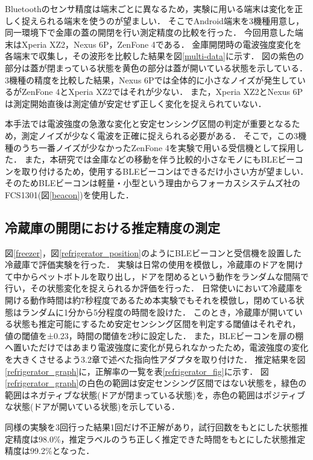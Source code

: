 Bluetoothのセンサ精度は端末ごとに異なるため，実験に用いる端末は変化を正しく捉えられる端末を使うのが望ましい．
そこでAndroid端末を3機種用意し，同一環境下で金庫の蓋の開閉を行い測定精度の比較を行った．
今回用意した端末はXperia XZ2，Nexus 6P，ZenFone 4である．
金庫開閉時の電波強度変化を各端末で収集し，その波形を比較した結果を図\ref{multi-data}に示す．
図の紫色の部分は蓋が閉まっている状態を黄色の部分は蓋が開いている状態を示している．
3機種の精度を比較した結果，Nexus 6Pでは全体的に小さなノイズが発生しているがZenFone 4とXperia XZ2ではそれが少ない．
また，Xperia XZ2とNexus 6Pは測定開始直後は測定値が安定せず正しく変化を捉えられていない．

本手法では電波強度の急激な変化と安定センシング区間の判定が重要となるため，測定ノイズが少なく電波を正確に捉えられる必要がある．
そこで，この3機種のうち一番ノイズが少なかったZenFone 4を実験で用いる受信機として採用した．
また，本研究では金庫などの移動を伴う比較的小さなモノにもBLEビーコンを取り付けるため，使用するBLEビーコンはできるだけ小さい方が望ましい．
そのためBLEビーコンは軽量・小型という理由からフォーカスシステムズ社のFCS1301(図\ref{beacon})を使用した．


\subsection{冷蔵庫の開閉における推定精度の測定}
図\ref{freezer}，図\ref{refrigerator_position}のようにBLEビーコンと受信機を設置した冷蔵庫で評価実験を行った．
実験は日常の使用を模倣し，冷蔵庫のドアを開けて中からペットボトルを取り出し，ドアを閉めるという動作をランダムな間隔で行い，その状態変化を捉えられるか評価を行った．
日常使いにおいて冷蔵庫を開ける動作時間は約7秒程度であるため本実験でもそれを模倣し，閉めている状態はランダムに1分から5分程度の時間を設けた．
このとき，冷蔵庫が開いている状態も推定可能にするため安定センシング区間を判定する閾値はそれぞれ，値の閾値を±0.23，時間の閾値を2秒に設定した．
また，BLEビーコンを扉の棚へ置いただけではあまり電波強度に変化が見られなかったため，電波強度の変化を大きくさせるよう3.2章で述べた指向性アダプタを取り付けた．
推定結果を図\ref{refrigerator_graph}に，正解率の一覧を表\ref{refrigerator_fig}に示す．
図\ref{refrigerator_graph}の白色の範囲は安定センシング区間ではない状態を，緑色の範囲はネガティブな状態(ドアが閉まっている状態)を，赤色の範囲はポジティブな状態(ドアが開いている状態)を示している．

同様の実験を3回行った結果1回だけ不正解があり，試行回数をもとにした状態推定精度は98.0\%，推定ラベルのうち正しく推定できた時間をもとにした状態推定精度は99.2\%となった．


